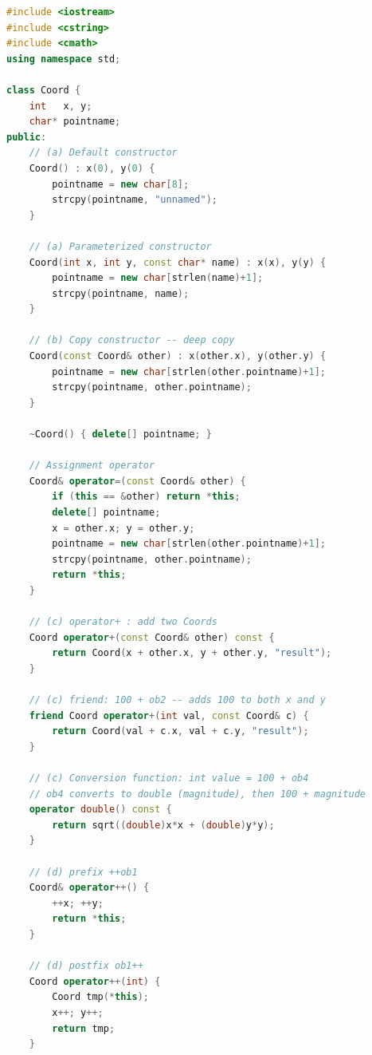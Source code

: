 \documentclass[12pt,a3paper]{article}
\begin{document}
\begin{enumerate}
\begin{tcolorbox}[enhanced,breakable,ansbox,
  colback=cF!4,colframe=cF,boxrule=0.8pt,arc=5pt,
  title={\textbf{Answer --- Coord Class: Constructors, Operators, Conversion}},
  fonttitle=\bfseries\color{white},colbacktitle=cF]
\begin{lstlisting}[language=C++]
#include <iostream>
#include <cstring>
#include <cmath>
using namespace std;

class Coord {
    int   x, y;
    char* pointname;
public:
    // (a) Default constructor
    Coord() : x(0), y(0) {
        pointname = new char[8];
        strcpy(pointname, "unnamed");
    }

    // (a) Parameterized constructor
    Coord(int x, int y, const char* name) : x(x), y(y) {
        pointname = new char[strlen(name)+1];
        strcpy(pointname, name);
    }

    // (b) Copy constructor -- deep copy
    Coord(const Coord& other) : x(other.x), y(other.y) {
        pointname = new char[strlen(other.pointname)+1];
        strcpy(pointname, other.pointname);
    }

    ~Coord() { delete[] pointname; }

    // Assignment operator
    Coord& operator=(const Coord& other) {
        if (this == &other) return *this;
        delete[] pointname;
        x = other.x; y = other.y;
        pointname = new char[strlen(other.pointname)+1];
        strcpy(pointname, other.pointname);
        return *this;
    }

    // (c) operator+ : add two Coords
    Coord operator+(const Coord& other) const {
        return Coord(x + other.x, y + other.y, "result");
    }

    // (c) friend: 100 + ob2 -- adds 100 to both x and y
    friend Coord operator+(int val, const Coord& c) {
        return Coord(val + c.x, val + c.y, "result");
    }

    // (c) Conversion function: int value = 100 + ob4
    // ob4 converts to double (magnitude), then 100 + magnitude
    operator double() const {
        return sqrt((double)x*x + (double)y*y);
    }

    // (d) prefix ++ob1
    Coord& operator++() {
        ++x; ++y;
        return *this;
    }

    // (d) postfix ob1++
    Coord operator++(int) {
        Coord tmp(*this);
        x++; y++;
        return tmp;
    }


\end{lstlisting}
\end{tcolorbox}
\end{enumerate}
\end{document}
